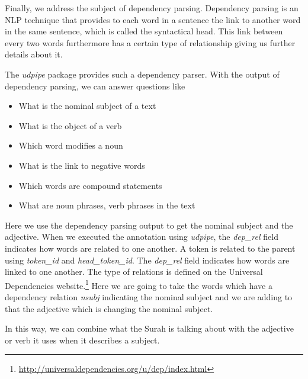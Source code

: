 \documentclass[
]{article}
\providecommand{\tightlist}{%
  \setlength{\itemsep}{0pt}\setlength{\parskip}{0pt}}
\begin{document}
Finally, we address the subject of dependency parsing. Dependency parsing is an NLP technique that provides to each word in a sentence the link to another word in the same sentence, which is called the syntactical head. This link between every two words furthermore has a certain type of relationship giving us further details about it.

The \emph{udpipe} package provides such a dependency parser. With the output of dependency parsing, we can answer questions like

\begin{itemize}
\tightlist
\item
  What is the nominal subject of a text
\item
  What is the object of a verb
\item
  Which word modifies a noun
\item
  What is the link to negative words
\item
  Which words are compound statements
\item
  What are noun phrases, verb phrases in the text
\end{itemize}

Here we use the dependency parsing output to get the nominal subject and the adjective. When we executed the annotation using \emph{udpipe}, the \emph{dep\_rel} field indicates how words are related to one another. A token is related to the parent using \emph{token\_id} and \emph{head\_token\_id}. The \emph{dep\_rel} field indicates how words are linked to one another. The type of relations is defined on the Universal Dependencies website.\footnote{ \url{http://universaldependencies.org/u/dep/index.html}} Here we are going to take the words which have a dependency relation \emph{nsubj} indicating the nominal subject and we are adding to that the adjective which is changing the nominal subject.

In this way, we can combine what the Surah is talking about with the adjective or verb it uses when it describes a subject.

\footnotesize
\end{document}
